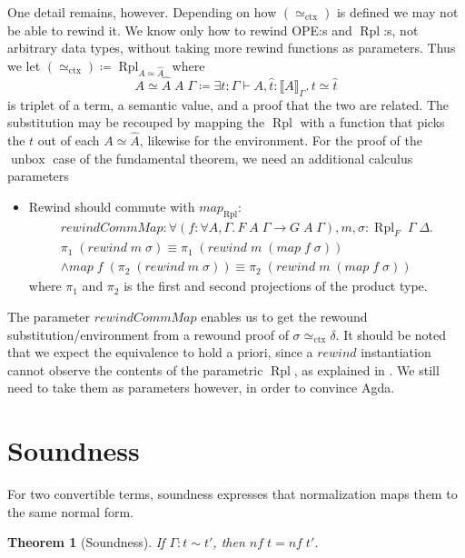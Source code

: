 \documentclass[12pt,twoside,openright]{report}
\numberwithin{equation}{chapter}
\numberwithin{figure}{chapter}
\numberwithin{table}{chapter}
\newtheorem{theorem}{Theorem}
\theoremstyle{definition}\newtheorem{definition}{Definition}
\begin{document}
One detail remains, however.
Depending on how $(\simeq_\text{ctx})$ is defined we may not be able to rewind it.
We know only how to rewind OPE:s and $\operatorname{Rpl}$:s,
not arbitrary data types, without taking more rewind functions as parameters.
Thus we let $(\simeq_\text{ctx}) \coloneqq \operatorname{Rpl}_{A\simeq\widehat A}$ where
$$ A\!\simeq\!\widehat A \; A \; \Gamma \coloneqq \exists t : \Gamma \vdash A, \hat t : \llbracket A \rrbracket_\Gamma.\, t \simeq \hat t $$
is triplet of a term, a semantic value, and a proof that the two are related.
The substitution may be recouped by mapping the $\operatorname{Rpl}$
with a function that picks the $t$ out of each $A\!\simeq\!\widehat A$,
likewise for the environment.
For the proof of the $\operatorname{unbox}$ case of the fundamental theorem,
we need an additional calculus parameters
\begin{itemize}
\item Rewind should commute with $\textit{map}_{\operatorname{Rpl}}$:
  \begin{multline*}
  \textit{rewindCommMap} : \forall (f : \forall A, \Gamma.\, F \; A \; \Gamma \to G \; A \; \Gamma), m, \sigma : \operatorname{Rpl}_F \; \Gamma \; \Delta. \\
  \pi_1 \; (\textit{rewind} \; m \; \sigma) \equiv \pi_1 \; (\textit{rewind} \; m \; (\textit{map} \; f \; \sigma)) \\
  \land \textit{map} \; f \; (\pi_2 \; (\textit{rewind} \; m \; \sigma)) \equiv \pi_2 \; (\textit{rewind} \; m \; (\textit{map} \; f \; \sigma))
  \end{multline*}
  where $\pi_1$ and $\pi_2$ is the first and second projections of the product type.
\end{itemize}
The parameter $\textit{rewindCommMap}$ enables us
to get the rewound substitution/environment
from a rewound proof of $\sigma \simeq_\text{ctx} \delta$.
It should be noted that we expect the equivalence to hold a priori,
since a $\textit{rewind}$ instantiation cannot observe
the contents of the parametric $\operatorname{Rpl}$,
as explained in  \cite{wadler89}.
We still need to take them as parameters however,
in order to convince Agda.

\section{Soundness}

For two convertible terms,
soundness expresses that normalization maps them to the same normal form.
\begin{theorem}[Soundness]
  If $\Gamma : t \sim t'$, then $\textit{nf} \; t = \textit{nf} \; t'$.
\end{theorem}
\end{document}
